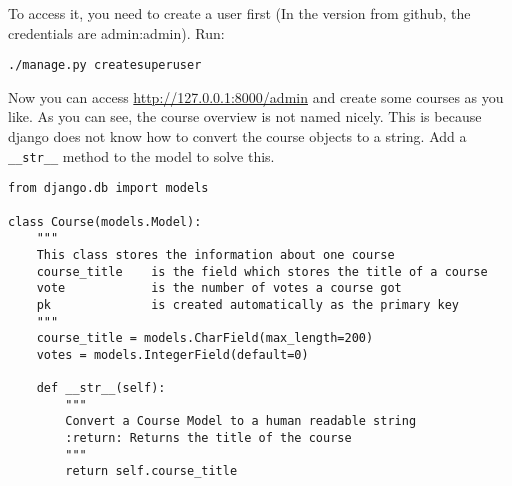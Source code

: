 To access it, you need to create a user first (In the version from github, the credentials are admin:admin). Run:
\begin{lstlisting}[style=Bash, caption=Create superuser, label=lst:create_superuser]
./manage.py createsuperuser
\end{lstlisting}
Now you can access \url{http://127.0.0.1:8000/admin} and create some courses as you like. As you can see, the course overview is not named nicely. This is because django does not know how to convert the course objects to a string. Add a \lstinline|__str__| method to the model to solve this.

\begin{lstlisting}[style=Python, caption=scorecard/models.py, label=lst:models.py]
from django.db import models

class Course(models.Model):
    """
    This class stores the information about one course
    course_title    is the field which stores the title of a course
    vote            is the number of votes a course got
    pk              is created automatically as the primary key
    """
    course_title = models.CharField(max_length=200)
    votes = models.IntegerField(default=0)

    def __str__(self):
        """
        Convert a Course Model to a human readable string
        :return: Returns the title of the course
        """
        return self.course_title
\end{lstlisting}